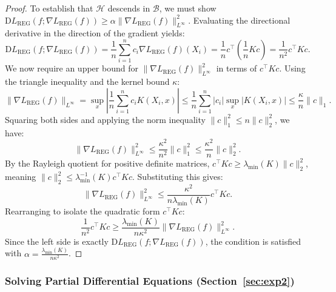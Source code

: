 \documentclass{article}
\newcommand{\D}{\mathrm{D}}
\begin{document}
\begin{proof}
    To establish that $\mathcal{H}$ descends in $\mathcal{B}$,
    we must show $\D L_\mathrm{REG}(f; \nabla L_\mathrm{REG}(f)) \geq \alpha \lVert \nabla L_\mathrm{REG}(f) \rVert_{L^\infty}^2$.
    Evaluating the directional derivative in the direction of the gradient yields:
    \[
        \D L_\mathrm{REG}(f; \nabla L_\mathrm{REG}(f)) = \frac{1}{n} \sum_{i=1}^n c_i \nabla L_\mathrm{REG}(f)(X_i) = \frac{1}{n} c^\top \left( \frac{1}{n} K c \right) = \frac{1}{n^2} c^\top K c.
    \]
    We now require an upper bound for $\lVert \nabla L_\mathrm{REG}(f) \rVert_{L^\infty}^2$ in terms of $c^\top K c$. Using the triangle inequality and the kernel bound $\kappa$:
    \[
        \lVert \nabla L_\mathrm{REG}(f) \rVert_{L^\infty} = \sup_{x} \left\lvert \frac{1}{n} \sum_{i=1}^n c_i K(X_i, x) \right\rvert \leq \frac{1}{n} \sum_{i=1}^n \lvert c_i \rvert \sup_{x} \lvert K(X_i, x) \rvert \leq \frac{\kappa}{n} \lVert c \rVert_1.
    \]
    Squaring both sides and applying the norm inequality $\lVert c \rVert_1^2 \leq n \lVert c \rVert_2^2$, we have:
    \[
        \lVert \nabla L_\mathrm{REG}(f) \rVert_{L^\infty}^2 \leq \frac{\kappa^2}{n^2} \lVert c \rVert_1^2 \leq \frac{\kappa^2}{n} \lVert c \rVert_2^2.
    \]
    By the Rayleigh quotient for positive definite matrices, $c^\top K c \geq \lambda_{\min}(K) \lVert c \rVert_2^2$, meaning $\lVert c \rVert_2^2 \leq \lambda_{\min}^{-1}(K) c^\top K c$. Substituting this gives:
    \[
        \lVert \nabla L_\mathrm{REG}(f) \rVert_{L^\infty}^2 \leq \frac{\kappa^2}{n \lambda_{\min}(K)} c^\top K c.
    \]
    Rearranging to isolate the quadratic form $c^\top K c$:
    \[
        \frac{1}{n^2} c^\top K c \geq \frac{\lambda_{\min}(K)}{n \kappa^2} \lVert \nabla L_\mathrm{REG}(f) \rVert_{L^\infty}^2.
    \]
    Since the left side is exactly $\D L_\mathrm{REG}(f; \nabla L_\mathrm{REG}(f))$, the condition is satisfied with $\alpha = \frac{\lambda_{\min}(K)}{n \kappa^2}$.
\end{proof}

\subsubsection{Solving Partial Differential Equations (Section~\ref{sec:exp2})}
\end{document}
